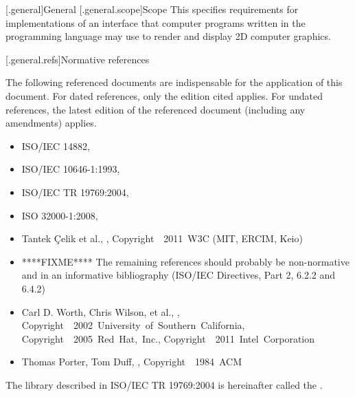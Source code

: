 [\iotwod.general]{General}
[\iotwod.general.scope]{Scope}
\pnum
{}%
This \documenttypename{} specifies requirements for implementations
of an interface that computer programs written in the \Cpp programming
language may use to render and display 2D computer graphics.

[\iotwod.general.refs]{Normative references}

\pnum
{}%
The following referenced documents are indispensable for the application
of this document. For dated references, only the edition cited applies.
For undated references, the latest edition of the referenced document
(including any amendments) applies.

\begin{itemize}
\item ISO/IEC 14882, 
\item ISO/IEC 10646-1:1993, 
\item ISO/IEC TR 19769:2004, 
\item ISO 32000-1:2008, 
\item Tantek \c{C}elik et al., , 
Copyright~\textcopyright~2011~W3C\textsuperscript{\textregistered} (MIT, ERCIM, 
Keio)
\item ****FIXME**** The remaining references should probably be non-normative 
and in an informative bibliography (ISO/IEC Directives, Part 2, 6.2.2 and 6.4.2)
\item Carl D. Worth, Chris Wilson, et al., , 
Copyright~\textcopyright~2002~University~of~Southern~California, 
Copyright~\textcopyright~2005~Red~Hat,~Inc., 
Copyright~\textcopyright~2011~Intel~Corporation
\item Thomas Porter, Tom Duff, , 
Copyright~\textcopyright~1984~ACM
\end{itemize}

\pnum
The library described in ISO/IEC TR 19769:2004 is hereinafter called the
.

